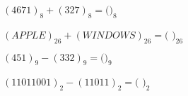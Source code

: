 \documentclass[handout,numbers]{ximera}
\begin{document}
\begin{question} $(4671)_8 + (327)_8 = ($\qquad\qquad {}$)_8$
\end{question}

\begin{question} $(APPLE)_{26}+(WINDOWS)_{26} = ($ \qquad\qquad {}$)_{26}$
\end{question}

\begin{question} $(451)_9 - (332)_9 = ($\qquad\qquad {}$)_9$

\end{question}

\begin{question} $(11011001)_2 - (11011)_2 = ($ \qquad\qquad {}$)_2$

\end{question}
\end{document}
